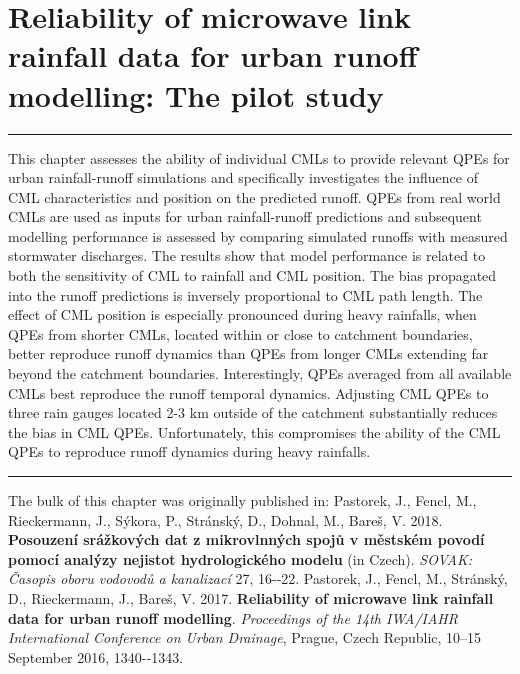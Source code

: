 \documentclass{ctuthesis}\usepackage[]{graphicx}\usepackage[]{color}
\begin{document}

\chapter{Reliability of microwave link rainfall data for urban runoff modelling: The pilot study} \label{chap3}

\rule{\textwidth}{0.4pt}
This chapter assesses the ability of individual CMLs to provide relevant QPEs for urban rainfall-runoff simulations and specifically investigates the influence of CML characteristics and position on the predicted runoff. QPEs from real world CMLs are used as inputs for urban rainfall-runoff predictions and subsequent modelling performance is assessed by comparing simulated runoffs with measured stormwater discharges. The results show that model performance is related to both the sensitivity of CML to rainfall and CML position. The bias propagated into the runoff predictions is inversely proportional to CML path length. The effect of CML position is especially pronounced during heavy rainfalls, when QPEs from shorter CMLs, located within or close to catchment boundaries, better reproduce runoff dynamics than QPEs from longer CMLs extending far beyond the catchment boundaries. Interestingly, QPEs averaged from all available CMLs best reproduce the runoff temporal dynamics. Adjusting CML QPEs to three rain gauges located 2-3 km outside of the catchment substantially reduces the bias in CML QPEs. Unfortunately, this compromises the ability of the CML QPEs to reproduce runoff dynamics during heavy rainfalls.
\rule[0.2cm]{\textwidth}{0.4pt}

{\footnotesize The bulk of this chapter was originally published in: \newline
\-\hspace{0.5cm}
Pastorek, J., Fencl, M., Rieckermann, J., Sýkora, P., Stránský, D., Dohnal, M., Bareš, V. 2018. \textbf{Posouzení srážkových dat z mikrovlnných spojů v městském povodí pomocí analýzy nejistot hydrologického modelu} (in Czech). \emph{SOVAK: Časopis oboru vodovodů a kanalizací} 27, 16-‐22. \newline
\-\hspace{0.5cm}
Pastorek, J., Fencl, M., Stránský, D., Rieckermann, J., Bareš, V. 2017. \textbf{Reliability of microwave link rainfall data for urban runoff modelling}. \emph{Proceedings of the 14th IWA/IAHR International Conference on Urban Drainage}, Prague, Czech Republic, 10--15 September 2016, 1340-‐1343.
}
\end{document}
